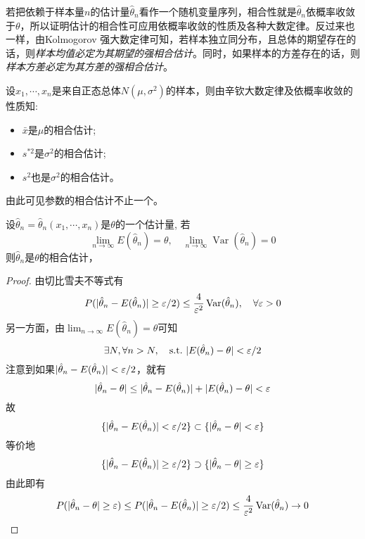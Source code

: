 若把依赖于样本量$n$的估计量$\hat\theta_n$看作一个随机变量序列，相合性就是$\hat\theta_n$依概率收敛于$\theta$，所以证明估计的相合性可应用依概率收敛的性质及各种大数定律。反过来也一样，由Kolmogorov 强大数定律可知，若样本独立同分布，且总体的期望存在的话，则\emph{样本均值必定为其期望的强相合估计}。同时，如果样本的方差存在的话，则\emph{样本方差必定为其方差的强相合估计}。

\begin{example}
    设$x_1,\cdots,x_n$是来自正态总体$N(\mu,\sigma^2)$的样本，则由辛钦大数定律及依概率收敛的性质知:
    \begin{itemize}
        \item$\bar x$是$\mu$的相合估计;
        \item$s^{*2}$是$\sigma^2$的相合估计;
        \item$s^2$也是$\sigma^2$的相合估计。
    \end{itemize}
    由此可见参数的相合估计不止一个。
\end{example}

\begin{theorem}[相合性定理]
    设$\hat\theta_n=\hat\theta_n(x_1,\cdots,x_n)$是$\theta$的一个估计量, 若
    \[ \lim_{n \to \infty} E(\hat\theta_n)=\theta, \quad \lim_{n \to \infty} \operatorname{Var}(\hat\theta_n)=0 \]
    则$\hat\theta_n$是$\theta$的相合估计，
\end{theorem}
\begin{proof}
    由切比雪夫不等式有
    \[ P(|\hat\theta_n - E(\hat\theta_n)| \ge \varepsilon/2) \le \frac{4}{\varepsilon^2} \operatorname{Var}(\hat\theta_n), \quad \forall  \varepsilon>0\]
    另一方面，由$\lim_{n \to \infty} E(\hat\theta_n)=\theta$可知
    \[ \exists N , \forall n>N ,\quad \mathrm{s.t.}\  |E(\hat\theta_n)-\theta| < \varepsilon/2\]
    注意到如果$|\hat\theta_n-E(\hat\theta_n)|<\varepsilon/2$，就有
    \[ |\hat\theta_n - \theta| \le |\hat\theta_n - E(\hat\theta_n)|+|E(\hat\theta_n) - \theta| < \varepsilon\]
    故
    \[ \{|\hat\theta_n - E(\hat\theta_n)| < \varepsilon/2\} \subset \{ | \hat\theta_n - \theta | < \varepsilon \} \]
    等价地
    \[ \{ |\hat\theta_n - E(\hat\theta_n)| \ge  \varepsilon/2 \} \supset \{|\hat\theta_n - \theta| \ge \varepsilon \}\]
    由此即有
    \[ P(|\hat\theta_n - \theta| \ge \varepsilon) \le P(|\hat\theta_n - E(\hat\theta_n)| \ge \varepsilon/2) \le \frac{4}{\varepsilon^2} \operatorname{Var}(\hat\theta_n) \to 0 \]
\end{proof}

